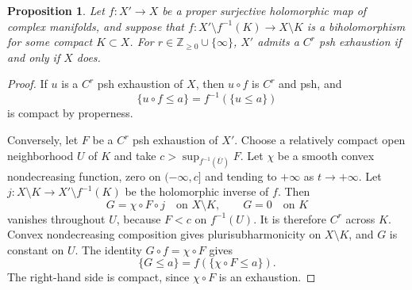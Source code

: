 \documentclass[11pt]{amsart}
\newtheorem{proposition}[theorem]{Proposition}
\theoremstyle{definition}
\theoremstyle{remark}
\numberwithin{equation}{section}
\begin{document}
\begin{proposition}\label{prop:compact-modification}
Let $f:X'\to X$ be a proper surjective holomorphic map of complex
manifolds, and suppose that
$f:X'\setminus f^{-1}(K)\to X\setminus K$ is a biholomorphism for
some compact $K\subset X$. For $r\in\mathbb Z_{\ge0}\cup\{\infty\}$,
$X'$ admits a $C^r$ psh
exhaustion if and only if $X$ does.
\end{proposition}
\begin{proof}
If $u$ is a $C^r$ psh exhaustion of $X$, then $u\circ f$ is
$C^r$ and psh, and
\[
 \{u\circ f\le a\}=f^{-1}(\{u\le a\})
\]
is compact by properness.

Conversely, let $F$ be a $C^r$ psh exhaustion of $X'$.
Choose a relatively compact open neighborhood $U$ of $K$ and take
$c>\sup_{f^{-1}(\overline U)}F$. Let $\chi$ be a smooth convex
nondecreasing function, zero on $(-\infty,c]$ and tending to
$+\infty$ as $t\to+\infty$.
Let $j:X\setminus K\to X'\setminus f^{-1}(K)$ be the
holomorphic inverse of $f$. Then
\[
 G=\chi\circ F\circ j\quad\text{on }X\setminus K,
 \qquad G=0\quad\text{on }K
\]
vanishes throughout $U$, because $F<c$ on $f^{-1}(U)$.
It is therefore $C^r$ across $K$. Convex nondecreasing composition
gives plurisubharmonicity on $X\setminus K$, and $G$ is constant on $U$.
The identity $G\circ f=\chi\circ F$ gives
\[
 \{G\le a\}=f(\{\chi\circ F\le a\}).
\]
The right-hand side is compact, since $\chi\circ F$ is an exhaustion.
\end{proof}
\end{document}
